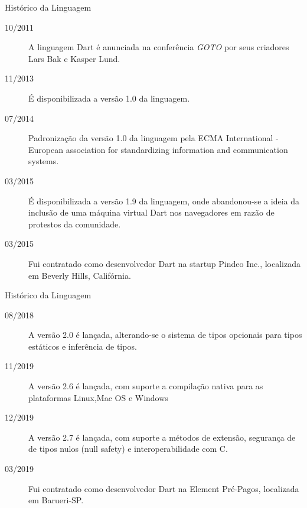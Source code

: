 \documentclass[usenames,dvipsnames,10pt]{beamer}
\begin{document}
\begin{frame}{Histórico da Linguagem}

\begin{description}

	\item[10/2011] A linguagem Dart é anunciada na conferência \emph{GOTO} por seus criadores Lars Bak e Kasper Lund.
	\item[11/2013] É disponibilizada a versão 1.0 da linguagem.
	\item[07/2014] Padronização da versão 1.0 da linguagem pela ECMA International - European association for standardizing information and communication systems.
	\item[03/2015] É disponibilizada a versão 1.9 da linguagem, onde abandonou-se a ideia da inclusão de uma máquina virtual Dart nos navegadores em razão de protestos da comunidade.
	\item[03/2015] Fui contratado como desenvolvedor Dart na startup Pindeo Inc., localizada em Beverly Hills, Califórnia.

\end{description}

\end{frame}

\begin{frame}{Histórico da Linguagem}

\begin{description}

	\item[08/2018] A versão 2.0 é lançada, alterando-se o sistema de tipos opcionais para tipos estáticos e inferência de tipos.
	\item[11/2019] A versão 2.6 é lançada, com suporte a compilação nativa para as plataformas Linux,Mac OS e Windows
	\item[12/2019] A versão 2.7 é lançada, com suporte a métodos de extensão, segurança de de tipos nulos (null safety) e interoperabilidade com C.
	\item[03/2019] Fui contratado como desenvolvedor Dart na Element Pré-Pagos, localizada em Barueri-SP.
	
\end{description}

\end{frame}

%
%
%
%
%
\end{document}
